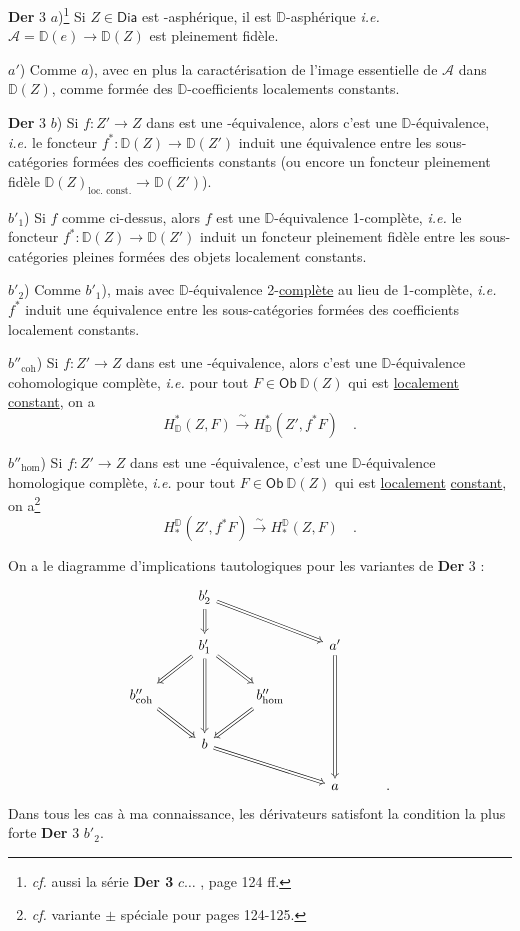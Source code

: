 \documentclass[11pt,leqno]{article}
\newcommand{\printedpage}[1]{\marginpar{\footnotesize p.~#1}}
\newcommand{\msp}[1]{\marginpar{\footnotesize [#1]}}
\newcommand{\DD}{\mathbb{D}}
\newcommand{\Dia}{\mathsf{Dia}}
\newcommand{\Hot}{\mathsf{Hot}}
\newcommand{\HOT}{\mathsf{HOT}}
\begin{document}
\textbf{Der} 3 $a$)\footnote[58]{\textit{cf.} aussi la série \textbf{Der 3} $c \ldots$ , page 124 ff.} Si $Z \in \mathsf{Dia}$ est \Hot-asphérique, il est $\DD$-asphérique \textit{i.e.} $\mathcal{A} = \DD(e) \to \DD(Z)$ est pleinement fidèle. %

$a'$) Comme $a$), avec en plus la caractérisation de l'image essentielle de $\mathcal{A}$ dans $\DD(Z)$, comme formée des $\DD$-coefficients localements constants. %

\textbf{Der} 3 $b$) Si $f : Z' \to Z$ dans \Dia{} est une \Hot-équivalence, alors c'est une $\DD$-équivalence, \textit{i.e.} le foncteur $f^{*} : \DD(Z) \to \DD(Z')$ induit une équivalence entre les sous-catégories formées des coefficients constants (ou encore un foncteur pleinement fidèle $\DD(Z)_{\text{loc. const.}} \longrightarrow \DD(Z')$).

$b'_1$) Si $f$ comme ci-dessus, alors $f$ est une $\DD$-équivalence 1-complète, \textit{i.e.} le foncteur $f^{*} : \DD(Z) \to \DD(Z')$ induit un foncteur pleinement fidèle
\msp{page 112}
entre les sous-catégories pleines formées des objets localement constants.

$b'_2$) Comme $b'_1$), mais avec $\DD$-équivalence 2-\underline{complète} au lieu de 1-complète, \textit{i.e.} $f^{*}$ induit une équivalence entre les sous-catégories formées des coefficients localement constants.

$b''_{\mathrm{coh}}$) Si $f : Z' \to Z$ dans \Dia{} est une \Hot-équivalence, alors c'est une $\DD$-équivalence cohomologique complète, \textit{i.e.} pour tout $F \in \mathsf{Ob}\ \DD(Z)$ qui est \underline{localement} \underline{constant}, on a
\[ H^{*}_{\DD}(Z,F) \xrightarrow{\ \sim\ } H^{*}_{\DD}(Z',f^{*}F) \quad . \]

$b''_{\mathrm{hom}}$) Si $f : Z' \to Z$ dans \Dia{} est une \Hot-équivalence, c'est une $\DD$-équivalence homologique complète, \textit{i.e.} pour tout $F \in \mathsf{Ob}\ \DD(Z)$ qui est \underline{localement} \underline{constant}, on a\footnote[59]{\textit{cf.} variante $\pm$ spéciale pour \HOT{} pages 124-125.}
\[ H_{*}^{\DD}(Z',f^{*}F) \xrightarrow{\ \sim\ } H_{*}^{\DD}(Z,F) \quad . \]

\printedpage{67}

On a le diagramme d'implications tautologiques pour les variantes de \textbf{Der} 3 :
\[
\begin{tikzcd}
 & b'_2 \arrow[d, Rightarrow] \arrow[drr, Rightarrow] & & & \\
 & b'_1 \arrow[dl, Rightarrow] \arrow[dr, Rightarrow] \arrow[dd, Rightarrow] & & a' \arrow[ddd, Rightarrow] & \\
b''_{\mathrm{coh}} \arrow[dr, Rightarrow] & & b''_{\mathrm{hom}} \arrow[dl, Rightarrow] & & \\
 & b \arrow[drr, Rightarrow] & & & \\
 & & & a & .
\end{tikzcd}
\]
Dans tous les cas à ma connaissance, les dérivateurs satisfont la condition la plus forte \textbf{Der} 3 $b'_2$.
\msp{page 113}
\end{document}
